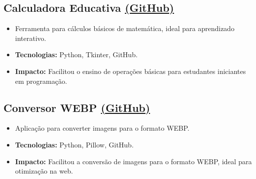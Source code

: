 \documentclass[a4paper,10pt]{article}
\begin{document}
\subsection*{Calculadora Educativa \href{https://github.com/Isllanrx/Projeto-Calculadora}{(GitHub)}}
\begin{itemize}
    \item Ferramenta para cálculos básicos de matemática, ideal para aprendizado interativo.
    \item \textbf{Tecnologias:} Python, Tkinter, GitHub.
    \item \textbf{Impacto:} Facilitou o ensino de operações básicas para estudantes iniciantes em programação.
\end{itemize}

\subsection*{Conversor WEBP \href{https://github.com/Isllanrx/Conversor_WEBP}{(GitHub)}}
\begin{itemize}
    \item Aplicação para converter imagens para o formato WEBP.
    \item \textbf{Tecnologias:} Python, Pillow, GitHub.
    \item \textbf{Impacto:} Facilitou a conversão de imagens para o formato WEBP, ideal para otimização na web.
\end{itemize}
\end{document}
